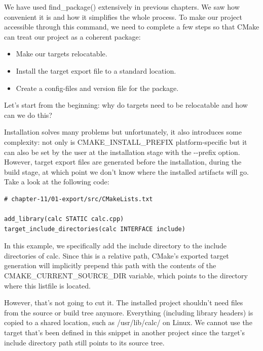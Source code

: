 
We have used find\_package() extensively in previous chapters. We saw how convenient it is and how it simplifies the whole process. To make our project accessible through this command, we need to complete a few steps so that CMake can treat our project as a coherent package:

\begin{itemize}
\item 
Make our targets relocatable.

\item 
Install the target export file to a standard location.

\item 
Create a config-files and version file for the package.
\end{itemize}

Let's start from the beginning: why do targets need to be relocatable and how can we do this?


Installation solves many problems but unfortunately, it also introduces some complexity: not only is CMAKE\_INSTALL\_PREFIX platform-specific but it can also be set by the user at the installation stage with the -{}-prefix option. However, target export files are generated before the installation, during the build stage, at which point we don't know where the installed artifacts will go. Take a look at the following code:

\begin{lstlisting}[style=styleCMake]
# chapter-11/01-export/src/CMakeLists.txt

add_library(calc STATIC calc.cpp)
target_include_directories(calc INTERFACE include)
\end{lstlisting}

In this example, we specifically add the include directory to the include directories of calc.
Since this is a relative path, CMake's exported target generation will implicitly prepend this path with the contents of the CMAKE\_CURRENT\_SOURCE\_DIR variable, which points to the directory where this listfile is located.

However, that's not going to cut it. The installed project shouldn't need files from the source or build tree anymore. Everything (including library headers) is copied to a shared location, such as /usr/lib/calc/ on Linux. We cannot use the target that's been defined in this snippet in another project since the target's include directory path still points to its source tree.

